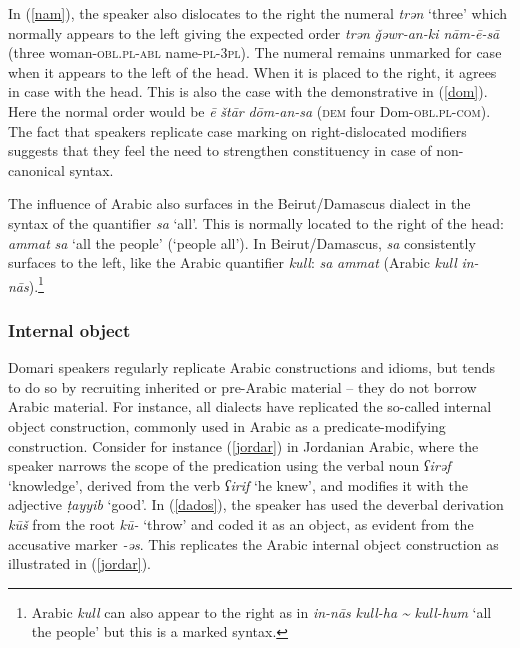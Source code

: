 \documentclass[output=paper]{langsci/langscibook}
\begin{document}
In (\ref{nam}), the speaker also dislocates to the right the numeral \textit{trən} ‘three’ which normally appears to the left giving the expected order \textit{trən} \textit{\v{g}əwr-an-ki nām-ē-sā} (three woman-\textsc{obl}.\textsc{pl}{}-\textsc{abl} name-\textsc{pl}{}-\textsc{3pl}). The numeral remains unmarked for case when it appears to the left of the head. When it is placed to the right, it agrees in case with the head. This is also the case with the demonstrative in (\ref{dom}). Here the normal order would be \textit{ē} \textit{štār} \textit{dōm-an-sa} (\textsc{dem} four Dom-\textsc{obl.pl}{}-\textsc{com}). The fact that speakers replicate case marking on right-dislocated modifiers suggests that they feel the need to strengthen constituency in case of non-canonical syntax.

The influence of Arabic also surfaces in the Beirut/Damascus dialect in the syntax of the quantifier \textit{sa} ‘all’. This is normally located to the right of the head: \textit{ammat} \textit{sa} ‘all the people’ (`people all'). In Beirut/Damascus, \textit{sa} consistently surfaces to the left, like the Arabic quantifier \textit{kull}: \textit{sa} \textit{ammat} (Arabic \textit{kull} \textit{in-nās}).\footnote{Arabic \textit{kull} can also appear to the right as in \textit{in-nās} \textit{kull-ha} \textit{{\textasciitilde} kull-hum} ‘all the people’ but this is a marked syntax.}


 \subsubsection{Internal object}

Domari speakers regularly replicate Arabic constructions and idioms, but tends to do so by recruiting inherited or pre-Arabic material -- they do not borrow Arabic material. For instance, all dialects have replicated the so-called internal object construction, commonly used in Arabic as a predicate-modifying construction. Consider for instance (\ref{jordar}) in Jordanian Arabic, where the speaker narrows the scope of the predication using the verbal noun \textit{ʕirəf} ‘knowledge’, derived from the verb \textit{ʕirif} ‘he knew’, and modifies it with the adjective \textit{ṭayyib} ‘good’. In (\ref{dados}), the speaker has used the deverbal derivation \textit{kūš} from the root \textit{kū-} ‘throw’ and coded it as an object, as evident from the accusative marker \textit{-əs}. This replicates the Arabic internal object construction as illustrated in (\ref{jordar}).
\end{document}
